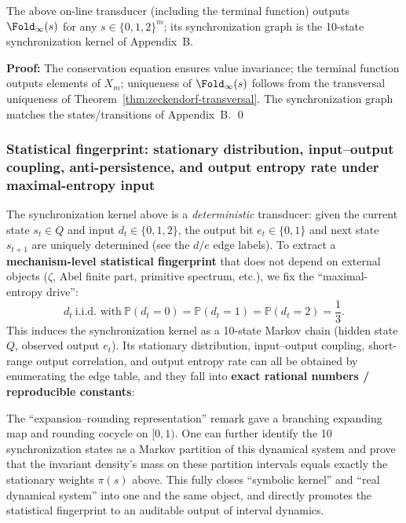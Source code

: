 \begin{theorem}\label{thm:online-delay-fold}
The above on-line transducer (including the terminal function) outputs $\Fold_\infty(s)$ for any $s\in\{0,1,2\}^m$; its synchronization graph is the 10-state synchronization kernel of Appendix~B.
\end{theorem}

\textbf{Proof:}
The conservation equation ensures value invariance; the terminal function outputs elements of $X_m$; uniqueness of $\Fold_\infty(s)$ follows from the transversal uniqueness of Theorem~\ref{thm:zeckendorf-transversal}. The synchronization graph matches the states/transitions of Appendix~B. \qed

\subsubsection{Statistical fingerprint: stationary distribution, input--output coupling, anti-persistence, and output entropy rate under maximal-entropy input}\label{subsec:sync10-stat-fingerprint}
The synchronization kernel above is a \emph{deterministic} transducer: given the current state $s_t\in Q$ and input $d_t\in\{0,1,2\}$, the output bit $e_t\in\{0,1\}$ and next state $s_{t+1}$ are uniquely determined (see the $d/e$ edge labels).
To extract a \textbf{mechanism-level statistical fingerprint} that does not depend on external objects ($\zeta$, Abel finite part, primitive spectrum, etc.), we fix the ``maximal-entropy drive'':
$$
d_t\ \text{i.i.d. with}\ \mathbb P(d_t=0)=\mathbb P(d_t=1)=\mathbb P(d_t=2)=\frac{1}{3}.
$$
This induces the synchronization kernel as a 10-state Markov chain (hidden state $Q$, observed output $e_t$). Its stationary distribution, input--output coupling, short-range output correlation, and output entropy rate can all be obtained by enumerating the edge table, and they fall into \textbf{exact rational numbers / reproducible constants}:


\begin{remark}
The ``expansion--rounding representation'' remark gave a branching expanding map and rounding cocycle on $[0,1)$.
One can further identify the 10 synchronization states as a Markov partition of this dynamical system and prove that the invariant density's mass on these partition intervals equals exactly the stationary weights $\pi(s)$ above.
This fully closes ``symbolic kernel'' and ``real dynamical system'' into one and the same object, and directly promotes the statistical fingerprint to an auditable output of interval dynamics.
\end{remark}

